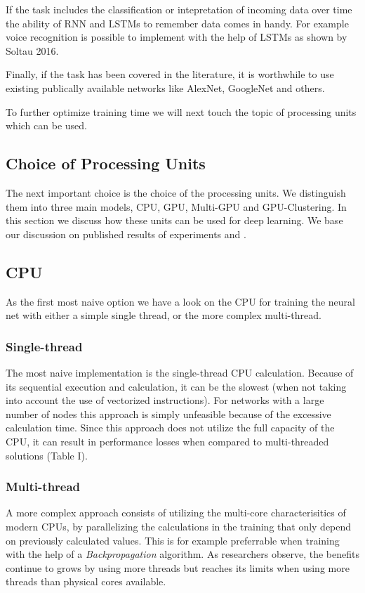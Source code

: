\documentclass[conference]{IEEEtran}
\begin{document}
If the task includes the classification or intepretation of incoming data over time the ability of RNN and LSTMs to remember data comes in handy. For example voice recognition is possible to implement with the help of LSTMs as shown by Soltau 2016\cite{soltau2016neural}.

Finally, if the task has been covered in the literature, it is worthwhile to use existing publically available networks like AlexNet, GoogleNet and others.

To further optimize training time we will next touch the topic of processing units which can be used.





\subsection{Choice of Processing Units}
The next important choice is the choice of the processing units. We distinguish them into three main models, CPU, GPU, Multi-GPU and GPU-Clustering. In this section we discuss how these units can be used for deep learning. We base our discussion on published results of experiments \cite{shi2016benchmarking} and \cite{sastre2017scalability}. 


\subsection{CPU}
As the first most naive option we have a look on the CPU for training the neural net with either a simple single thread, or the more complex multi-thread.


\subsubsection{Single-thread}
The most naive implementation is the single-thread CPU calculation. Because of its sequential execution and calculation, it can be the slowest (when not taking into account the use of vectorized instructions). For networks with a large number of nodes this approach is simply unfeasible because of the excessive calculation time. Since this approach does not utilize the full capacity of the CPU, it can result in performance losses when compared to multi-threaded solutions (Table I).


\subsubsection{Multi-thread}
A more complex approach consists of utilizing the multi-core characterisitics of modern CPUs, by parallelizing the calculations in the training that only depend on previously calculated values. This is for example preferrable when training with the help of a \emph{Backpropagation} algorithm. As researchers observe, the benefits continue to grows by using more threads but reaches its limits when using more threads than physical cores available.
\end{document}
